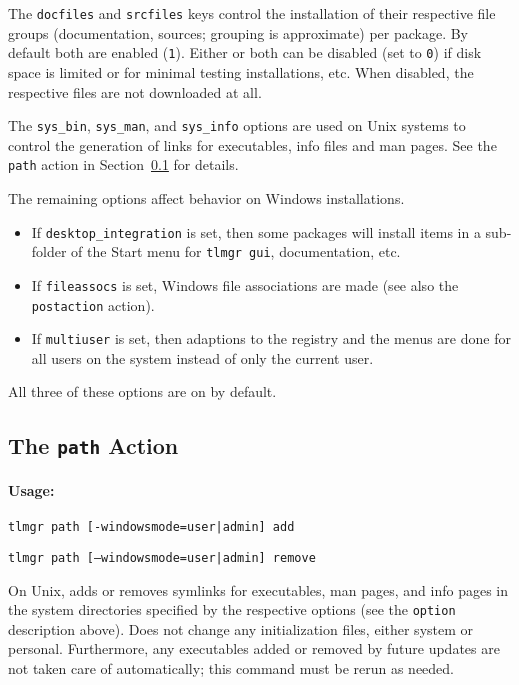 \documentclass[11pt]{article}
\begin{document}
The \texttt{docfiles} and \texttt{srcfiles} keys control the
installation of their respective file groups (documentation,
sources; grouping is approximate) per package. By default
both are enabled (\verb|1|). Either or both can be disabled
(set to \verb|0|) if disk space is limited or for minimal
testing installations, etc. When disabled, the respective
files are not downloaded at all.

The \verb|sys_bin|, \verb|sys_man|, and \verb|sys_info|
options are used on Unix systems to control the generation
of links for executables, info files and man pages. See the
\texttt{path} action in Section~\ref{path} for details.

The remaining options affect behavior on Windows installations.  

\begin{itemize}
  \item If \texttt{desktop\_integration} is set,
then some packages will install items in a sub-folder of the Start menu for \texttt{tlmgr gui},
documentation, etc.  
  \item If \texttt{fileassocs} is set, Windows file associations are made (see also the
\texttt{postaction} action).  
   \item If \texttt{multiuser} is set, then adaptions to the registry and the
menus are done for all users on the system instead of only the current user.  
\end{itemize}
All three of these options are on by default.

\clearpage

\subsection{The {\tt path} Action}
\label{path}

\paragraph{Usage:}

\begin{list}{}{}
 \item     \texttt{tlmgr path [-windowsmode=user|admin] add}
 \item     \texttt{tlmgr path [--windowsmode=user|admin] remove}
\end{list}

On Unix, adds or removes symlinks for executables, man
pages, and info pages in the system directories specified by
the respective options (see the \texttt{option} description
above). Does not change any initialization files, either
system or personal. Furthermore, any executables added
or removed by future updates are not taken care of
automatically; this command must be rerun as needed.
\end{document}

